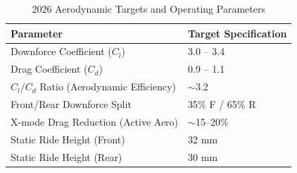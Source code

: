 \begin{table}[H]
\centering
\caption{2026 Aerodynamic Targets and Operating Parameters}
\vspace{0.2cm}
\begin{tabularx}{\textwidth}{@{}XX@{}}
\toprule
\textbf{Parameter} & \textbf{Target Specification} \\
\midrule
Downforce Coefficient ($C_l$) & 3.0 -- 3.4 \\
Drag Coefficient ($C_d$) & 0.9 -- 1.1 \\
$C_l / C_d$ Ratio (Aerodynamic Efficiency) & $\sim$3.2 \\
Front/Rear Downforce Split & 35\% F / 65\% R \\
X-mode Drag Reduction (Active Aero) & $\sim$15--20\% \\
Static Ride Height (Front) & 32 mm \\
Static Ride Height (Rear) & 30 mm \\
\bottomrule
\end{tabularx}
\label{tab:aero_targets}
\end{table}

